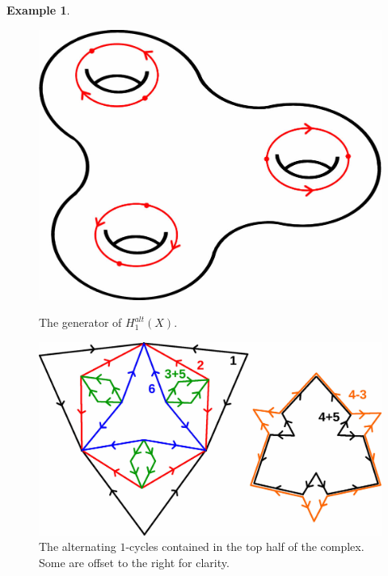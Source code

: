 \documentclass[11pt,a4paper,twoside]{article}
\theoremstyle{plain}
\theoremstyle{definition}
\theoremstyle{definition}
\theoremstyle{definition}
\theoremstyle{definition}
\newtheorem{example}[thm]{Example}
\theoremstyle{definition}
\begin{document}
\begin{example}
\begin{figure}
\begin{minipage}{.48\textwidth}
\end{minipage}%
\hfill
\begin{minipage}{.48\textwidth}
  \centering
\includegraphics[scale=0.18]{Images/Genus3AltHom1Generator.jpg}
    \caption{The generator of $H_1^{alt}(X)$.}
    \label{Fig:Genus3AltHom1Generator}
\end{minipage}


    \centering
\includegraphics[scale=0.14]{Images/Genus3AltCycles.jpg}
    \caption{The alternating $1$-cycles contained in the top half of the complex. Some are offset to the right for clarity.}
    \label{Fig:Genus3Alt1Cycles}

\end{figure}



\end{example}
\end{document}
